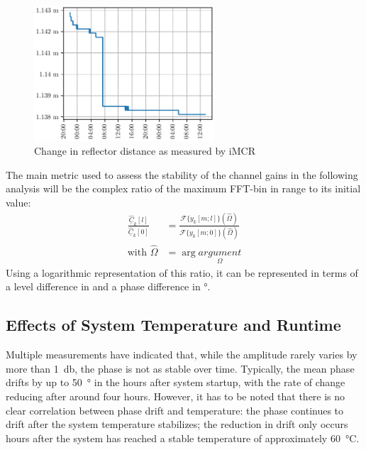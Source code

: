 \begin{figure}
    \centering
    \includegraphics[width=0.6\textwidth]{../figures/refldist.pdf}
    \caption{Change in reflector distance as measured by iMCR}
    \label{fig:refldist}
\end{figure}

The main metric used to assess the stability of the channel gains in the following analysis
will be the complex ratio of the maximum FFT-bin in range to its initial value:
\begin{align}
    \frac{\underline{\hat C}_k[l]}{\underline{\hat C}_k[0]} 
    &= \frac{\mathcal{F}\{y_{k}[m;l]\}(\hat\Omega)}{\mathcal{F}\{y_{k}[m;0]\}(\hat\Omega)} \\
    \text{with } \hat\Omega &= \arg \underset{\Omega}{argument}
\end{align}
Using a logarithmic representation of this ratio,
it can be represented in terms of a level difference in \unit{\dBr} and a phase difference in \unit{\degree}.

\subsection{Effects of System Temperature and Runtime}

Multiple measurements have indicated that, while the amplitude rarely varies by more than \SI{1}{\decibel},
the phase is not as stable over time.
Typically, the mean phase drifts by up to \SI{50}{\degree} in the hours after system startup,
with the rate of change reducing after around four hours.
However, it has to be noted that there is no clear correlation between phase drift and temperature:
the phase continues to drift after the system temperature stabilizes;
the reduction in drift only occurs hours after the system has reached a stable temperature of approximately \SI{60}{\celsius}.

